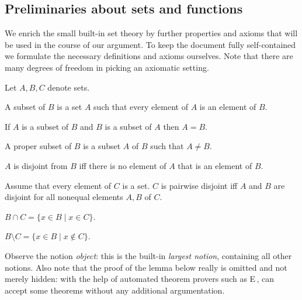 \subsection{Preliminaries about sets and functions}

We enrich the small built-in set theory by further properties and axioms that
will be used in the course of our argument. To keep the document fully
self-contained we formulate the necessary definitions and axioms ourselves.
Note that there are many degrees of freedom in picking an axiomatic setting.

\begin{forthel}
    Let $A,B,C$ denote sets.

    \begin{definition}
        A subset of $B$ is a set $A$ such that
        every element of $A$ is an element of $B$.
    \end{definition}

    \begin{axiom}[Extensionality]
        If $A$ is a subset of $B$ and
        $B$ is a subset of $A$ then $A = B$.
    \end{axiom}

    \begin{definition}
        A proper subset of $B$ is a subset $A$ of $B$ such that $A\neq B$.
    \end{definition}

    \begin{definition}
        $A$ is disjoint from $B$ iff there is no element of $A$ that is an element of $B$.
    \end{definition}

    \begin{definition}
        Assume that every element of $C$ is a set.
        $C$ is pairwise disjoint iff $A$ and $B$ are disjoint for all nonequal
        elements $A, B$ of $C$.
    \end{definition}


    \begin{definition}
        $B \cap C = \{ x \in B \mid x \in C\}$.
    \end{definition}

    \begin{definition}
        $B \setminus C = \{ x \in B \mid x \notin C\}$.
    \end{definition}
\end{forthel}

Observe the notion \textit{object}:
this is the built-in \textit{largest notion}, containing all other notions.
%
Also note that the proof of the lemma below really is omitted and not merely hidden:
with the help of automated theorem provers such as \textsf{E}\,\cite{eprover}, \Naproche{}
can accept some theorems without any additional argumentation.


